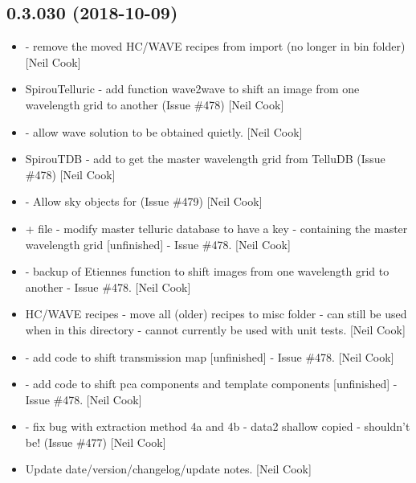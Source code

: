 \documentclass[a4paper,10pt,english]{report}
\begin{document}
\subsection{0.3.030 (2018-10-09)}
\label{\detokenize{misc/changelog:id300}}\begin{itemize}
\item {} 
 - remove the moved HC/WAVE recipes from import
(no longer in bin folder) {[}Neil Cook{]}

\item {} 
SpirouTelluric - add function wave2wave to shift an image from one
wavelength grid to another (Issue \#478) {[}Neil Cook{]}

\item {} 
 - allow wave solution to be obtained quietly. {[}Neil
Cook{]}

\item {} 
SpirouTDB - add  to get the master wavelength
grid from TelluDB (Issue \#478) {[}Neil Cook{]}

\item {} 
 - Allow sky objects for  (Issue
\#479) {[}Neil Cook{]}

\item {} 
 + file - modify master telluric database to
have a  key - containing the master wavelength grid
{[}unfinished{]} - Issue \#478. {[}Neil Cook{]}

\item {} 
 - backup of Etiennes function to shift images from one
wavelength grid to another - Issue \#478. {[}Neil Cook{]}

\item {} 
HC/WAVE recipes - move all (older) recipes to misc folder - can still
be used when in this directory - cannot currently be used with unit
tests. {[}Neil Cook{]}

\item {} 
 - add code to shift transmission map {[}unfinished{]} -
Issue \#478. {[}Neil Cook{]}

\item {} 
 - add code to shift pca components and template
components {[}unfinished{]} - Issue \#478. {[}Neil Cook{]}

\item {} 
 - fix bug with extraction method 4a and 4b -
data2 shallow copied - shouldn’t be! (Issue \#477) {[}Neil Cook{]}

\item {} 
Update date/version/changelog/update notes. {[}Neil Cook{]}

\end{itemize}
\end{document}

